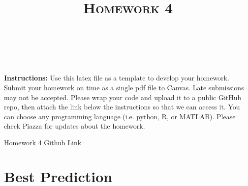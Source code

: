 \documentclass[a4paper]{article}
\title{\textsc{Homework 4}} %
\author{
\red{APOORVA KUMAR} \\
\red{908 461 5997}\\
}
\date{}
\theoremstyle{definition}
\newenvironment{soln}{
    \leavevmode\color{blue}\ignorespaces
}{}
\begin{document}
\maketitle 


\textbf{Instructions:} Use this latex file as a template to develop your homework. Submit your homework on time as a single pdf file to Canvas. Late submissions may not be accepted. Please wrap your code and upload it to a public GitHub repo, then attach the link below the instructions so that we can access it. You can choose any programming language (i.e. python, R, or MATLAB). Please check Piazza for updates about the homework.\\

\begin{soln}
    \Large
    \href{https://github.com/cybr17crwlr/ECE-760-Machine-Learning-Assignments/tree/master/Homework%204}{Homework 4 Github Link}
\end{soln}

\section{Best Prediction}
\end{document}
